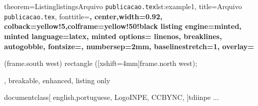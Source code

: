 \documentclass[10pt]{beamer}
\begin{document}
\begin{frame}{}
    \begin{tcblisting}{
        theorem={Listing}{listings}{Arquivo {\tt publicacao.tex}}{lst:example1},
        title=Arquivo {\tt publicacao.tex},
        fonttitle=\small\bfseries,
        center,width=0.92\paperwidth,
        colback=yellow!5,colframe=yellow!50!black
        listing engine=minted,
        minted language=latex,
        minted options={%
            linenos,
            breaklines,
            autogobble,
            fontsize=\small,
            numbersep=2mm,
            baselinestretch=1},
        overlay={%
        \begin{tcbclipinterior}
            \fill[gray!25] (frame.south west) rectangle ([xshift=4mm]frame.north west);
        \end{tcbclipinterior}},
        breakable, enhanced, listing only}
        documentclass[
        english,portuguese, 
        LogoINPE,
        CCBYNC,
        ]{tdiinpe}
        ...
    \end{tcblisting}
\end{frame}
\end{document}
